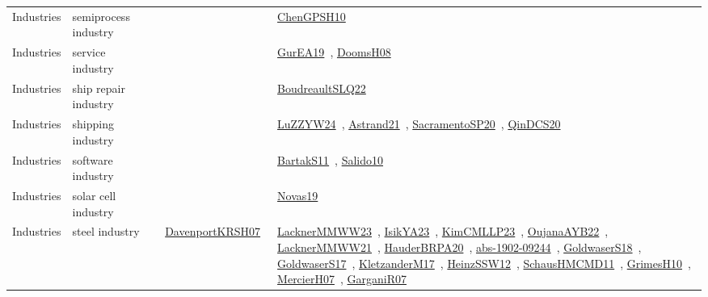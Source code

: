 {\begin{longtable}{lp{3cm}>{\raggedright\arraybackslash}p{6cm}>{\raggedright\arraybackslash}p{6cm}>{\raggedright\arraybackslash}p{8cm}}
\index{semiprocess industry}\index{Industries!semiprocess industry}Industries & semiprocess industry &  &  & \href{../works/ChenGPSH10.pdf}{ChenGPSH10}~\cite{ChenGPSH10}\\
\index{service industry}\index{Industries!service industry}Industries & service industry &  &  & \href{../works/GurEA19.pdf}{GurEA19}~\cite{GurEA19}, \href{../works/DoomsH08.pdf}{DoomsH08}~\cite{DoomsH08}\\
\index{ship repair industry}\index{Industries!ship repair industry}Industries & ship repair industry &  &  & \href{../works/BoudreaultSLQ22.pdf}{BoudreaultSLQ22}~\cite{BoudreaultSLQ22}\\
\index{shipping industry}\index{Industries!shipping industry}Industries & shipping industry &  &  & \href{../works/LuZZYW24.pdf}{LuZZYW24}~\cite{LuZZYW24}, \href{../works/Astrand21.pdf}{Astrand21}~\cite{Astrand21}, \href{../works/SacramentoSP20.pdf}{SacramentoSP20}~\cite{SacramentoSP20}, \href{../works/QinDCS20.pdf}{QinDCS20}~\cite{QinDCS20}\\
\index{software industry}\index{Industries!software industry}Industries & software industry &  &  & \href{../works/BartakS11.pdf}{BartakS11}~\cite{BartakS11}, \href{../works/Salido10.pdf}{Salido10}~\cite{Salido10}\\
\index{solar cell industry}\index{Industries!solar cell industry}Industries & solar cell industry &  &  & \href{../works/Novas19.pdf}{Novas19}~\cite{Novas19}\\
\index{steel industry}\index{Industries!steel industry}Industries & steel industry &  & \href{../works/DavenportKRSH07.pdf}{DavenportKRSH07}~\cite{DavenportKRSH07} & \href{../works/LacknerMMWW23.pdf}{LacknerMMWW23}~\cite{LacknerMMWW23}, \href{../works/IsikYA23.pdf}{IsikYA23}~\cite{IsikYA23}, \href{../works/KimCMLLP23.pdf}{KimCMLLP23}~\cite{KimCMLLP23}, \href{../works/OujanaAYB22.pdf}{OujanaAYB22}~\cite{OujanaAYB22}, \href{../works/LacknerMMWW21.pdf}{LacknerMMWW21}~\cite{LacknerMMWW21}, \href{../works/HauderBRPA20.pdf}{HauderBRPA20}~\cite{HauderBRPA20}, \href{../works/abs-1902-09244.pdf}{abs-1902-09244}~\cite{abs-1902-09244}, \href{../works/GoldwaserS18.pdf}{GoldwaserS18}~\cite{GoldwaserS18}, \href{../works/GoldwaserS17.pdf}{GoldwaserS17}~\cite{GoldwaserS17}, \href{../works/KletzanderM17.pdf}{KletzanderM17}~\cite{KletzanderM17}, \href{../works/HeinzSSW12.pdf}{HeinzSSW12}~\cite{HeinzSSW12}, \href{../works/SchausHMCMD11.pdf}{SchausHMCMD11}~\cite{SchausHMCMD11}, \href{../works/GrimesH10.pdf}{GrimesH10}~\cite{GrimesH10}, \href{../works/MercierH07.pdf}{MercierH07}~\cite{MercierH07}, \href{../works/GarganiR07.pdf}{GarganiR07}~\cite{GarganiR07}\\

\end{longtable}}
